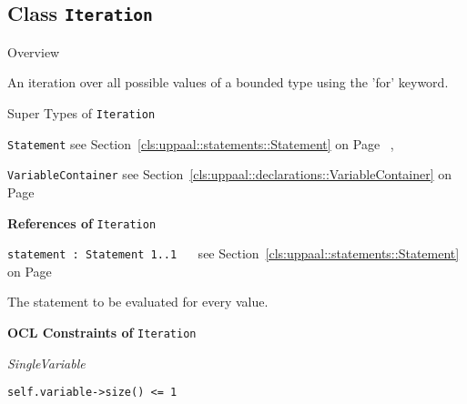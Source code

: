\subsection{Class \bfseries \texttt{Iteration}\normalfont}
\label{cls:uppaal::statements::Iteration} 
	
	\begin{longdescription}
		\item[Overview] 		
				

	

		An iteration over all possible values of a bounded type using the 'for' keyword.		
		\item[Super Types of \texttt{Iteration}] ~
			\begin{longdescription}
				\item[\texttt{Statement}] see Section~\ref{cls:uppaal::statements::Statement} on Page~\pageref{cls:uppaal::statements::Statement}			, 				\item[\texttt{VariableContainer}] see Section~\ref{cls:uppaal::declarations::VariableContainer} on Page~\pageref{cls:uppaal::declarations::VariableContainer}						\end{longdescription}
		
	
			\item[\textbf{References of} \texttt{Iteration}] ~
			\begin{longdescription}
	\item[\texttt{statement : Statement 	\symbol{"5B}1..1\symbol{"5D}
}] ~
	see Section~\ref{cls:uppaal::statements::Statement} on Page~\pageref{cls:uppaal::statements::Statement}
	
	\nopagebreak
		
				

	

		The statement to be evaluated for every value.		
			\end{longdescription}
			\item[\textbf{OCL Constraints of} \texttt{Iteration}] ~
			\begin{longdescription}
	\item[\small\textit{SingleVariable}] ~ 
	\nopagebreak
	
		\begin{lstlisting}[breaklines=true]
self.variable->size() <= 1		\end{lstlisting}
			\end{longdescription}
	
	\end{longdescription}
	

